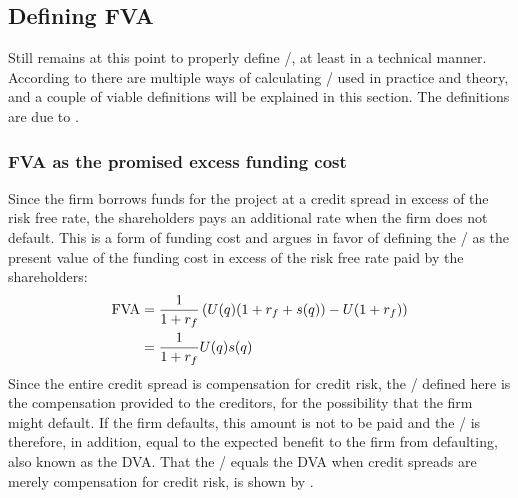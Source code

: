 \documentclass[../main.tex]{subfiles}
\begin{document}
    \subsection{Defining FVA}
        Still remains at this point to properly define \FVA/, at least in a technical manner.
        According to \cite{ADS2019} there are multiple ways of calculating \FVA/ used in practice and theory,
        and a couple of viable definitions will be explained in this section.
        The definitions are due to \cite{Hillion2016}.

        \subsubsection{FVA as the promised excess funding cost}
            Since the firm borrows funds for the project at a credit spread in excess of the risk free rate, 
            the shareholders pays an additional rate when the firm does not default. 
            This is a form of funding cost and argues in favor of defining the \FVA/ as
            the present value of the funding cost in excess of the risk free rate paid by the shareholders:
            \begin{align}
                \FVA/ 
                &= \discountfactor \left(
                    U(q) (1 + \rfrate + s(q))
                    - U (1 + \rfrate)
                \right) 
                \nonumber \\
                &= \discountfactor U(q) s(q)
                \label{eqn:fva-as-promised-excess-funding-cost}
            \end{align}
            Since the entire credit spread is compensation for credit risk,
            the \FVA/ defined here is the compensation provided to the creditors,
            for the possibility that the firm might default. 
            If the firm defaults, this amount is not to be paid and the \FVA/ is therefore, in addition, 
            equal to the expected benefit to the firm from defaulting, also known as the DVA. 
            That the \FVA/ equals the DVA when credit spreads are merely compensation for credit risk, 
            is shown by \cite{HullWhiteFVA}.
\end{document}
